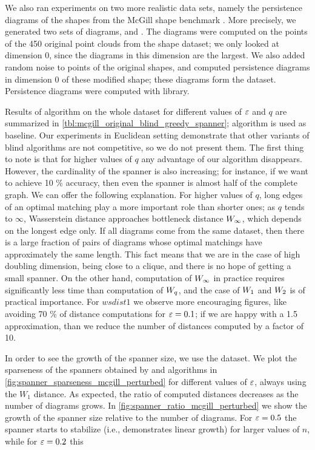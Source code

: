 \documentclass[a4paper,UKenglish,cleveref, autoref]{lipics-v2019}
\begin{document}
We also ran experiments on two more realistic data sets,
namely the persistence diagrams of the shapes 
from  the McGill shape benchmark \cite{zhang2005mcgill}. 
More precisely, we generated two sets of diagrams,
 and . The 
diagrams were computed on the points of the 450 original
point clouds from the shape dataset; we only looked
at dimension 0, since the diagrams in this dimension are the largest.
We also added random noise to points of the original shapes,
and computed persistence diagrams in dimension 0 of these modified
shape; these diagrams form the  dataset.
Persistence diagrams were computed with 
library.



Results of \bgrdy algorithm on the whole  dataset 
for different values of $\varepsilon$ and $q$ are summarized in \cref{tbl:mcgill_original_blind_greedy_spanner};
\grdy algorithm is used as baseline. Our experiments in Euclidean setting
demonstrate that other variants of blind algorithms are not competitive,
so we do not present them. The first thing to note is that for higher values of $q$
any advantage of our algorithm disappears. However, the cardinality of the \grdy
spanner is also increasing; for instance, if we want to achieve 10 \% accuracy,
then even the \grdy spanner is almost half of the complete graph.
We can offer the following explanation. For higher values of $q$,
long edges of an optimal matching play a more important role
than shorter ones; as $q$ tends to $\infty$, Wasserstein distance
approaches bottleneck distance ${W_\infty}$, which depends on the longest
edge only. If all diagrams come from the same dataset,
then there is a large fraction of pairs of diagrams whose optimal matchings
have approximately the same length. This fact means that we are in the case
of high doubling dimension, being close to a clique, and there is no hope
of getting a small spanner. On the other hand, computation of ${W_\infty}$ in practice
requires significantly less time than computation of ${W_{q}}$, and the case
of ${W_{1}}$ and ${W_{2}}$ is of practical importance.
For $wsdist{1}$ we observe more encouraging figures, like avoiding 70 \% of distance
computations for $\varepsilon = 0.1$; if we are happy with a 1.5 approximation, than we
reduce the number of distances computed by a factor of 10.



In order to see the growth of the spanner size, we use the 
dataset.  We plot the sparseness of the spanners obtained by \grdy
and \bgrdy algorithms in \cref{fig:spanner_sparseness_mcgill_perturbed}
for different values of $\varepsilon$, always using the $W_1$ distance.
As expected, the ratio of computed distances decreases as the number of diagrams
grows. In \cref{fig:spanner_ratio_mcgill_perturbed} we show
the growth of the spanner size relative to the number of diagrams. 
For $\varepsilon = 0.5$ the \bgrdy spanner starts to stabilize (i.e., demonstrates
linear growth) for larger values of $n$, while for $\varepsilon = 0.2$
this 
\end{document}
